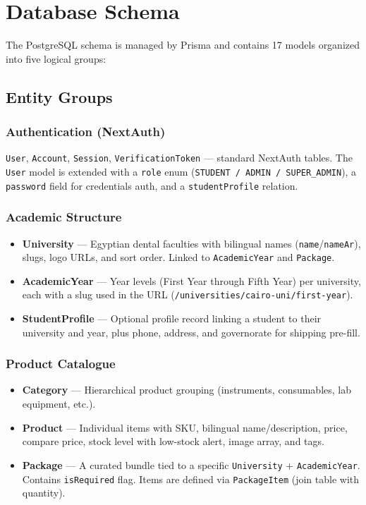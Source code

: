 \documentclass[12pt, a4paper]{article}
\begin{document}
\section{Database Schema}

The PostgreSQL schema is managed by Prisma and contains 17 models organized into five logical groups:

\subsection{Entity Groups}

\subsubsection{Authentication (NextAuth)}
\texttt{User}, \texttt{Account}, \texttt{Session}, \texttt{VerificationToken} — standard NextAuth tables. The \texttt{User} model is extended with a \texttt{role} enum (\texttt{STUDENT / ADMIN / SUPER\_ADMIN}), a \texttt{password} field for credentials auth, and a \texttt{studentProfile} relation.

\subsubsection{Academic Structure}
\begin{itemize}[leftmargin=*]
  \item \textbf{University} — Egyptian dental faculties with bilingual names (\texttt{name}/\texttt{nameAr}), slugs, logo URLs, and sort order. Linked to \texttt{AcademicYear} and \texttt{Package}.
  \item \textbf{AcademicYear} — Year levels (First Year through Fifth Year) per university, each with a slug used in the URL (\texttt{/universities/cairo-uni/first-year}).
  \item \textbf{StudentProfile} — Optional profile record linking a student to their university and year, plus phone, address, and governorate for shipping pre-fill.
\end{itemize}

\subsubsection{Product Catalogue}
\begin{itemize}[leftmargin=*]
  \item \textbf{Category} — Hierarchical product grouping (instruments, consumables, lab equipment, etc.).
  \item \textbf{Product} — Individual items with SKU, bilingual name/description, price, compare price, stock level with low-stock alert, image array, and tags.
  \item \textbf{Package} — A curated bundle tied to a specific \texttt{University} + \texttt{AcademicYear}. Contains \texttt{isRequired} flag. Items are defined via \texttt{PackageItem} (join table with quantity).
\end{itemize}
\end{document}
